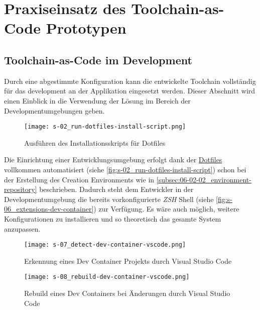 \section{Praxiseinsatz des Toolchain-as-Code Prototypen}
\label{sec:06-03_practical-use-of-the-toolchain-as-code-prototype}

\subsection{Toolchain-as-Code im Development}
\label{subsec:06-03-01_toolchain-as-code-in-development}

Durch eine abgestimmte Konfiguration kann die entwickelte Toolchain vollständig für das \Gls{development} an der Applikation eingesetzt werden. Dieser Abschnitt wird einen Einblick in die Verwendung der  Lösung im Bereich der Developmentumgebungen geben.

\begin{wrapfigure}{l}{0.7\textwidth}
    \vspace{-10pt}
    \centering
    \texttt{[image: s-02\_run-dotfiles-install-script.png]}
    \caption{Ausführen des Installationsskripts für Dotfiles}
    \label{fig:s-02_run-dotfiles-install-script}
    \vspace{-05pt}
\end{wrapfigure}

Die Einrichtung einer Entwicklungsumgebung erfolgt dank der \hyperref[sec:03-04_idea-of-dotfiles]{Dotfiles} vollkommen automatisiert (siehe \autoref{fig:s-02_run-dotfiles-install-script}) schon bei der Erstellung des Creation Environments wie in \autoref{subsec:06-02-02_environment-repository} beschrieben. Dadurch steht dem Entwickler in der Developmentumgebung die bereits vorkonfigurierte \textit{ZSH} Shell (siehe \autoref{fig:s-06_extensions-dev-container}) zur Verfügung. Es wäre auch möglich, weitere Konfigurationen zu installieren und so theoretisch das gesamte System anzupassen.

\begin{figure}[h]
    \centering
    \begin{minipage}[b]{0.49\textwidth}
        \centering
        \texttt{[image: s-07\_detect-dev-container-vscode.png]}
        \caption{Erkennung eines Dev Container Projekts durch Visual Studio Code}
        \label{fig:s-07_detect-dev-container-vscode}
    \end{minipage}
    \hfill
    \begin{minipage}[b]{0.49\textwidth}
        \centering
        \texttt{[image: s-08\_rebuild-dev-container-vscode.png]}
        \caption{Rebuild eines Dev Containers bei Änderungen durch Visual Studio Code}
        \label{fig:s-08_rebuild-dev-container-vscode}
    \end{minipage}
\end{figure}

